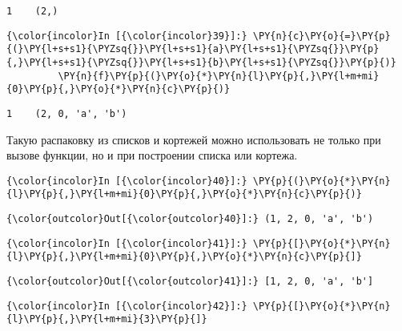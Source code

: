     \begin{Verbatim}[commandchars=\\\{\}]
1    (2,)

    \end{Verbatim}

    \begin{Verbatim}[commandchars=\\\{\}]
{\color{incolor}In [{\color{incolor}39}]:} \PY{n}{c}\PY{o}{=}\PY{p}{(}\PY{l+s+s1}{\PYZsq{}}\PY{l+s+s1}{a}\PY{l+s+s1}{\PYZsq{}}\PY{p}{,}\PY{l+s+s1}{\PYZsq{}}\PY{l+s+s1}{b}\PY{l+s+s1}{\PYZsq{}}\PY{p}{)}
         \PY{n}{f}\PY{p}{(}\PY{o}{*}\PY{n}{l}\PY{p}{,}\PY{l+m+mi}{0}\PY{p}{,}\PY{o}{*}\PY{n}{c}\PY{p}{)}
\end{Verbatim}

    \begin{Verbatim}[commandchars=\\\{\}]
1    (2, 0, 'a', 'b')

    \end{Verbatim}

    Такую распаковку из списков и кортежей можно использовать не только при
вызове функции, но и при построении списка или кортежа.

    \begin{Verbatim}[commandchars=\\\{\}]
{\color{incolor}In [{\color{incolor}40}]:} \PY{p}{(}\PY{o}{*}\PY{n}{l}\PY{p}{,}\PY{l+m+mi}{0}\PY{p}{,}\PY{o}{*}\PY{n}{c}\PY{p}{)}
\end{Verbatim}

            \begin{Verbatim}[commandchars=\\\{\}]
{\color{outcolor}Out[{\color{outcolor}40}]:} (1, 2, 0, 'a', 'b')
\end{Verbatim}
        
    \begin{Verbatim}[commandchars=\\\{\}]
{\color{incolor}In [{\color{incolor}41}]:} \PY{p}{[}\PY{o}{*}\PY{n}{l}\PY{p}{,}\PY{l+m+mi}{0}\PY{p}{,}\PY{o}{*}\PY{n}{c}\PY{p}{]}
\end{Verbatim}

            \begin{Verbatim}[commandchars=\\\{\}]
{\color{outcolor}Out[{\color{outcolor}41}]:} [1, 2, 0, 'a', 'b']
\end{Verbatim}
        
    \begin{Verbatim}[commandchars=\\\{\}]
{\color{incolor}In [{\color{incolor}42}]:} \PY{p}{[}\PY{o}{*}\PY{n}{l}\PY{p}{,}\PY{l+m+mi}{3}\PY{p}{]}
\end{Verbatim}

